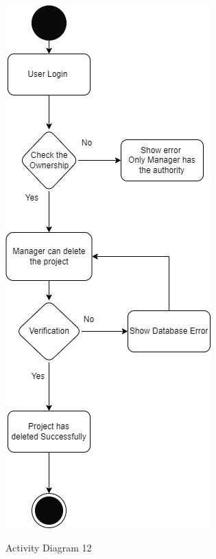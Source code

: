 \begin{figure}[H]
    \centering
    \caption{Activity Diagram 12}
    \includegraphics[scale=0.5]{./diagrams/Activity Diagram/ad-12.png}
    \label{fig:act-12}

\end{figure}


